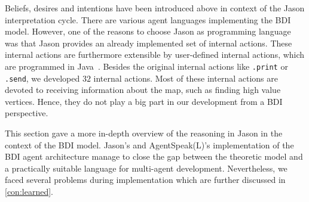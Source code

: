 Beliefs, desires and intentions have been introduced above in context of the Jason interpretation cycle.
There are various agent languages implementing the BDI model.
However, one of the reasons to choose Jason as programming language was that Jason provides an already implemented set of internal actions.
These internal actions are furthermore extensible by user-defined internal actions, which are programmed in Java~\cite{rafael_Javabased_2007}.
Besides the original internal actions like \texttt{.print} or \texttt{.send}, we developed $32$ internal actions.
Most of these internal actions are devoted to receiving information about the map, such as finding high value vertices.
Hence, they do not play a big part in our development from a BDI perspective.

This section gave a more in-depth overview of the reasoning in Jason in the context of the BDI model.
Jason's and AgentSpeak(L)'s implementation of the BDI agent architecture manage to close the gap between the theoretic model and a practically suitable language for multi-agent development.
Nevertheless, we faced several problems during implementation which are further discussed in \autoref{con:learned}.
